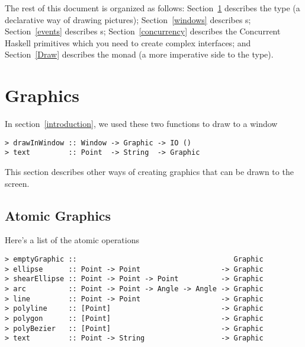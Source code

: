 The rest of this document is organized as follows:
Section~\ref{graphics} describes the  type (a declarative
    way of drawing pictures);
Section~\ref{windows} describes s;
Section~\ref{events} describes s;
Section~\ref{concurrency} describes the Concurrent Haskell
      primitives which you need to create complex interfaces; and
Section~\ref{Draw} describes the  monad (a more
      imperative side to the  type).



\section{Graphics}\label{graphics}

In section~\ref{introduction}, we used these two functions to draw 
to a window

\begin{verbatim}
> drawInWindow :: Window -> Graphic -> IO ()
> text         :: Point  -> String  -> Graphic
\end{verbatim}

This section describes other ways of creating graphics that can be
drawn to the screen.

\subsection{Atomic Graphics}\label{primitives}

Here's a list of the atomic operations

\begin{verbatim}
> emptyGraphic ::                                     Graphic
> ellipse      :: Point -> Point                   -> Graphic
> shearEllipse :: Point -> Point -> Point          -> Graphic
> arc          :: Point -> Point -> Angle -> Angle -> Graphic
> line         :: Point -> Point                   -> Graphic
> polyline     :: [Point]                          -> Graphic
> polygon      :: [Point]                          -> Graphic
> polyBezier   :: [Point]                          -> Graphic
> text         :: Point -> String                  -> Graphic
\end{verbatim}


